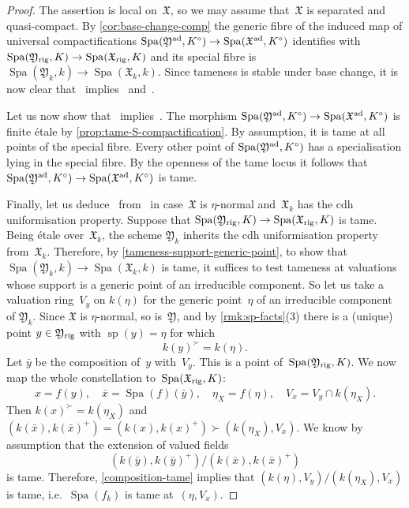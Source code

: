\documentclass[a4paper,twoside,11pt,reqno]{amsart}
\newcommand{\fX}{{\mathfrak{X}}}
\newcommand{\fY}{{\mathfrak{Y}}}
\DeclareMathOperator{\Spa}{Spa}
\DeclareMathOperator{\spe}{sp}
\newcommand{\rig}{{\rm rig}}
\theoremstyle{definition}
\numberwithin{equation}{subsection}
\begin{document}
\begin{proof}
The assertion is local on~$\fX$, so we may assume that~$\fX$ is separated and quasi-compact.
By \cref{cor:base-change-comp} the generic fibre of the induced map of universal compactifications $\Spa(\fY^{\rm ad}, K^\circ) \to \Spa(\fX^{\rm ad}, K^\circ)$ identifies with $\Spa(\fY_\rig, K) \to \Spa(\fX_\rig, K)$ and its special fibre is $\Spa(\fY_k,k) \to \Spa(\fX_k,k)$.
Since tameness is stable under base change, it is now clear that~ implies~ and~.

Let us now show that~ implies~.
The morphism $\Spa(\fY^{\rm ad},K^\circ) \to \Spa(\fX^{\rm ad},K^\circ)$ is finite étale by \cref{prop:tame-S-compactification}.
By assumption, it is tame at all points of the special fibre.
Every other point of $\Spa(\fY^{\rm ad},K^\circ)$ has a specialisation lying in the special fibre.
By the openness of the tame locus \cite[Corollary~4.4]{Hubner2021:AdicTameSite} it follows that $\Spa(\fY^{\rm ad}, K^\circ) \to \Spa(\fX^{\rm ad}, K^\circ)$ is tame.

Finally, let us deduce~ from~ in case~$\fX$ is $\eta$-normal and~$\fX_k$ has the cdh uniformisation property.
Suppose that $\Spa(\fY_\rig, K) \to \Spa(\fX_\rig, K)$ is tame.
Being étale over~$\fX_k$, the scheme $\fY_k$ inherits the cdh uniformisation property from~$\fX_k$. 
Therefore, by \cref{tameness-support-generic-point}, to show that $\Spa(\fY_k, k) \to \Spa(\fX_k, k)$ is tame, it suffices to test tameness at valuations whose support is a generic point of an irreducible component.
So let us take a valuation ring~$V_y$ on $k(\eta)$ for the generic point~$\eta$ of an irreducible component of $\fY_k$.
Since $\fX$ is $\eta$-normal, so is~$\fY$, and by \cref{rmk:sp-facts}(3) there is a (unique) point $y \in \fY_\rig$ with $\spe(y) = \eta$ for which
\[
k(y)^\succ = k(\eta).
\]
Let $\bar{y}$ be the composition of~$y$ with~$V_y$.
This is a point of~$\Spa(\fY_\rig,K)$.
We now map the whole constellation to~$\Spa(\fX_\rig,K)$:
\[
x = f(y),    \quad   \bar{x} = \Spa(f)(\bar{y}),   \quad   \eta_X = f(\eta),   \quad V_x = V_y \cap k(\eta_X).
\]
Then $k(x)^\succ = k(\eta_X)$ and $(k(\bar{x}),k(\bar{x})^+) = (k(x),k(x)^+) \succ (k(\eta_X),V_x)$.
We know by assumption that the extension of valued fields
\[
(k(\bar{y}),k(\bar{y})^+)/(k(\bar{x}),k(\bar{x})^+)
\]
is tame.
Therefore, \cref{composition-tame} implies that $(k(\eta),V_y)/(k(\eta_X),V_x)$
is tame, i.e.~$\Spa(f_k)$ is tame at~$(\eta,V_x)$.
\end{proof}
\end{document}
